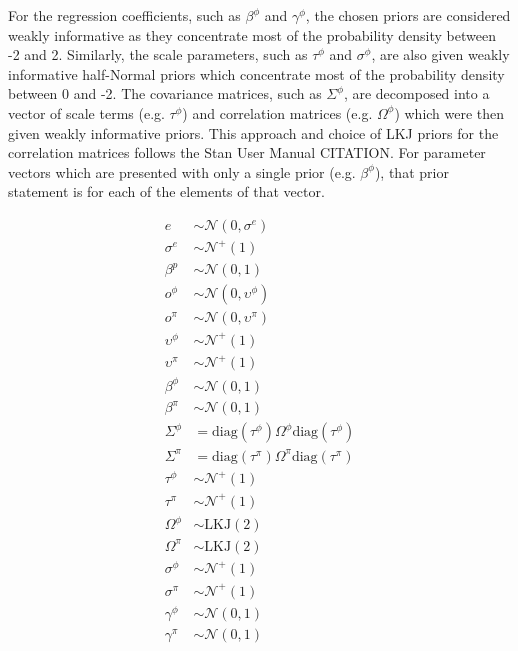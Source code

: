 \documentclass[12pt,letterpaper]{article}
\begin{document}
For the regression coefficients, such as \(\beta^{\phi}\) and \(\gamma^{\phi}\), the chosen priors are considered weakly informative as they concentrate most of the probability density between -2 and 2. Similarly, the scale parameters, such as \(\tau^{\phi}\) and \(\sigma^{\phi}\), are also given weakly informative half-Normal priors which concentrate most of the probability density between 0 and -2. The covariance matrices, such as \(\Sigma^{\phi}\), are decomposed into a vector of scale terms (e.g. \(\tau^{\phi}\)) and correlation matrices (e.g. \(\Omega^{\phi}\)) which were then given weakly informative priors. This approach and choice of LKJ priors for the correlation matrices follows the Stan User Manual CITATION. For parameter vectors which are presented with only a single prior (e.g. \(\beta^{\phi}\)), that prior statement is for each of the elements of that vector.


\begin{equation}
  \begin{aligned}
    e &\sim \mathcal{N}(0, \sigma^{e}) \\
    \sigma^{e} &\sim \mathcal{N}^{+}(1) \\
    \beta^{p} &\sim \mathcal{N}(0, 1) \\
    o^{\phi} &\sim \mathcal{N}(0, \upsilon^{\phi}) \\
    o^{\pi} &\sim \mathcal{N}(0, \upsilon^{\pi}) \\
    \upsilon^{\phi} &\sim \mathcal{N}^{+}(1) \\
    \upsilon^{\pi} &\sim \mathcal{N}^{+}(1) \\
    \beta^{\phi} &\sim \mathcal{N}(0, 1) \\
    \beta^{\pi} &\sim \mathcal{N}(0, 1) \\
    \Sigma^{\phi} &= \text{diag}(\tau^{\phi}) \Omega^{\phi} \text{diag}(\tau^{\phi}) \\
    \Sigma^{\pi} &= \text{diag}(\tau^{\pi}) \Omega^{\pi} \text{diag}(\tau^{\pi}) \\
    \tau^{\phi} &\sim \mathcal{N}^{+}(1) \\
    \tau^{\pi} &\sim \mathcal{N}^{+}(1) \\
    \Omega^{\phi} &\sim \text{LKJ}(2) \\
    \Omega^{\pi} &\sim \text{LKJ}(2) \\
    \sigma^{\phi} &\sim \mathcal{N}^{+}(1) \\
    \sigma^{\pi} &\sim \mathcal{N}^{+}(1) \\
    \gamma^{\phi} &\sim \mathcal{N}(0, 1) \\
    \gamma^{\pi} &\sim \mathcal{N}(0, 1) \\
  \end{aligned}
  \label{eq:prior}
\end{equation}
\end{document}
